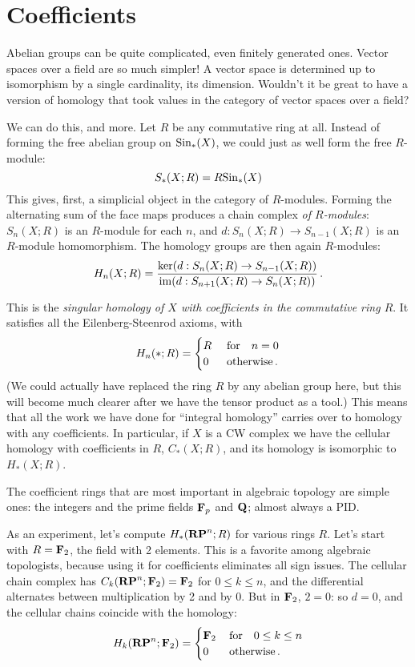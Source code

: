 \section{Coefficients}

Abelian groups can be quite complicated, even finitely generated ones. Vector spaces over a field are so much simpler! A vector space is determined up to isomorphism by a single cardinality, its dimension. Wouldn't it be great to have a version of homology that took values in the category of vector spaces over a field? 

We can do this, and more. Let $R$ be any commutative ring at all.
Instead of forming the free abelian group on $\mathrm{Sin}_*(X)$, we could just as 
well form the free $R$-module:
\[
S_*(X;R)=R\mathrm{Sin}_*(X)
\]
This gives, first, a simplicial object in the category of $R$-modules.
Forming the alternating sum of the face maps produces a chain complex 
{\em of $R$-modules}: $S_n(X;R)$ is an $R$-module for each $n$, and 
$d:S_n(X;R)\to S_{n-1}(X;R)$ is an $R$-module homomorphism. The homology
groups are then again $R$-modules:
\[
H_n(X;R)=\frac{\ker(d:S_n(X;R)\to S_{n-1}(X;R))}
{\operatorname{im}(d:S_{n+1}(X;R)\to S_n(X;R))}\,.
\]

This is the {\em singular homology of $X$ with coefficients in the commutative 
ring $R$}. It satisfies all the Eilenberg-Steenrod axioms, with 
\[
H_n(\ast;R)=
\begin{cases}R\,\,&\hbox{for}\quad n=0\\0\,\,&\hbox{otherwise}\,.\end{cases}
\]
(We could actually have replaced the ring $R$ by any abelian group here, 
but this will become much clearer after we have the tensor product as a tool.)
This means that all the work we have done for ``integral homology'' carries
over to homology with any coefficients. In particular, if $X$ is a CW complex
we have the cellular homology with coefficients in $R$, $C_*(X;R)$, and its
homology is isomorphic to $H_*(X;R)$. 

The coefficient rings that are most important in algebraic topology are 
simple ones: the integers and the prime fields $\mathbf F_p$ and $\mathbf Q$; 
almost always a PID.

As an experiment, let's compute $ H_\ast(\mathbf{RP}^n;R)$ for various rings $R$.
Let's start with $R=\mathbf F_2$, the field with 2 elements. This is a favorite
among algebraic topologists, because using it for coefficients eliminates 
all sign issues. The cellular chain complex has $C_k(\mathbf{RP}^n;\mathbf F_2)=\mathbf F_2$ for 
$0\leq k\leq n$, and the differential alternates between multiplication by 
2 and by 0. But in $\mathbf F_2$, $2=0$: so $d=0$, and the cellular chains
coincide with the homology:
\[
H_k(\mathbf{RP}^n;\mathbf F_2)=
\begin{cases}\mathbf F_2\,&\hbox{for}\quad 0\leq k\leq n\\0\,\,&\hbox{otherwise}\,.
\end{cases}
\]

